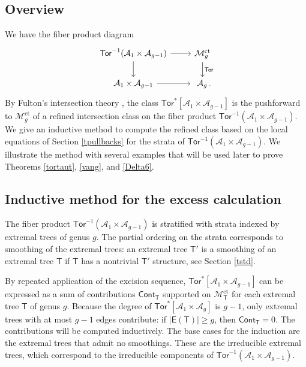 \documentclass[11pt]{amsart}
\theoremstyle{definition}
\newcommand{\M}{\mathcal{M}}
\newcommand{\A}{\mathcal{A}}
\DeclareMathOperator{\ct}{ct}
\newcommand{\Tor}{\mathsf{Tor}}
\begin{document}
{\subsection{Overview}
We have the fiber product diagram
\[
\begin{tikzcd}
\Tor^{-1}(\A_1\times \A_{g-1}) \arrow[d] \arrow[r] & \M_g^{\ct} \arrow[d, "\Tor"] \\
\A_1\times \A_{g-1} \arrow[r]       & \ \A_g \, .                       
\end{tikzcd}
\]
By Fulton's intersection theory \cite{Fulton}, the class $\Tor^*[\A_1\times \A_{g-1}]$ is the pushforward to $\M_g^{\ct}$ 
of a refined 
intersection class on the fiber product $\Tor^{-1}(\A_1\times\A_{g-1})$. We give an inductive method to compute the refined class based on the local equations of Section \ref{tpullbacks} for the strata of $\Tor^{-1}(\A_1\times\A_{g-1})$. We illustrate the method with several examples that will be used later to prove Theorems \ref{tortaut}, \ref{vang}, and \ref{Delta6}. 

\subsection{Inductive method for the excess calculation}\label{inductivesection}



The fiber product $\Tor^{-1}(\A_1\times \A_{g-1})$ is stratified
with strata
indexed by extremal trees of genus $g$. The partial ordering on the strata 
corresponds to smoothing
of the extremal trees: %
an extremal tree $\mathsf{T}'$ is a smoothing of an extremal tree $\mathsf{T}$ if $\mathsf{T}$ has a nontrivial $\mathsf{T}'$ structure, see Section \ref{tstd}.



By repeated application of the excision sequence, $\Tor^*[\A_1\times \A_{g-1}]$ can be expressed as a
sum of contributions $\mathsf{Cont}_\mathsf{T}$ supported on $\M^{\ct}_\mathsf{T}$ for each extremal tree $\mathsf{T}$ of genus $g$.  Because the degree of $\Tor^*[\A_1\times \A_g]$ is $g-1$, only extremal trees with at most $g-1$ edges contribute: if $|\mathsf{E}(\mathsf{T})|\geq g$, then $\mathsf{Cont}_\mathsf{T}=0$. The contributions will be computed inductively. The base cases for the induction are the extremal trees that admit no smoothings. These are the irreducible extremal trees, which correspond to the irreducible components of $\Tor^{-1}(\A_1\times\A_{g-1})$.

}
\end{document}
